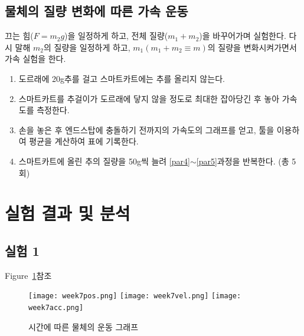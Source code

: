 \documentclass[12pt,a4paper]{article}
\begin{document}
\subsection{물체의 질량 변화에 따른 가속 운동}
끄는 힘($F=m_2g$)을 일정하게 하고, 전체 질량($m_1+m_2$)을 바꾸어가며 실험한다. 다시
말해 $m_2$의 질량을 일정하게 하고, $m_1(m_1+m_2\equiv m)$의 질량을 변화시켜가면서
가속 실험을 한다.
\begin{enumerate}
    \item 도르래에 20g추를 걸고 스마트카트에는 추를 올리지 않는다.
    \item \label{par4}스마트카트를 추걸이가 도르래에 닿지 않을 정도로 최대한 잡아당긴
        후 놓아 가속도를 측정한다.
    \item \label{par5}손을 놓은 후 엔드스탑에 충돌하기 전까지의 가속도의 그래프를
        얻고, 툴을 이용하여 평균을 계산하여 표에 기록한다.
    \item 스마트카트에 올린 추의 질량을 50g씩 늘려 \ref{par4}$\sim$\ref{par5}과정을
        반복한다. (총 5회)
\end{enumerate}
\section{실험 결과 및 분석}
\subsection{실험 1}
Figure~\ref{fig4}참조
\begin{figure}
    \centering
    \texttt{[image: week7pos.png]}
    \texttt{[image: week7vel.png]}
    \texttt{[image: week7acc.png]}
    \caption{\label{fig4}시간에 따른 물체의 운동 그래프}
\end{figure}
\end{document}
